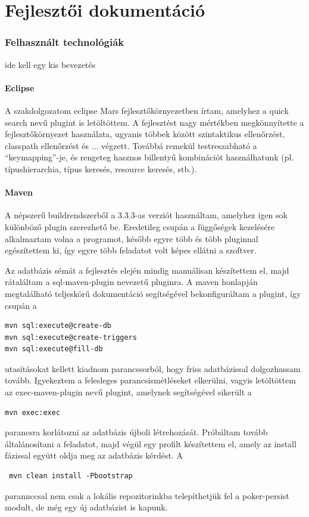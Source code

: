 \part{Fejlesztői dokumentáció}

\section{Felhasznált technológiák}
ide kell egy kis bevezetés

\subsection{Eclipse}
A szakdolgozatom eclipse Mars \cite{eclipse_mars} fejlesztőkörnyezetben írtam, amelyhez a quick search \cite{quick_search} nevű plugint is letöltöttem. A fejlesztést nagy mértékben megkönnyítette a fejlesztőkörnyezet használata, ugyanis többek között szintaktikus ellenőrzést, classpath ellenőrzést és ... végzett. Továbbá remekül testreszabható a ``keymapping''-je, és rengeteg hasznos billentyű kombinációt használhatunk (pl. típushierarchia, típus keresés, resource keresés, stb.).

\subsection{Maven}
A népszerű buildrendszerből a 3.3.3-as verziót használtam, amelyhez igen sok különböző plugin szerezhető be. Eredetileg csupán a függőségek kezelésére alkalmaztam volna a programot, később egyre több és több pluginnal egészítettem ki, így egyre több feladatot volt képes ellátni a szoftver.

Az adatbázis sémát a fejlesztés elején mindig manuálisan készítettem el, majd rátaláltam a sql-maven-plugin nevezetű pluginra. A maven honlapján megtalálható teljeskörű dokumentáció segítségével bekonfiguráltam a plugint, így csupán a
 \begin{verbatim}
mvn sql:execute@create-db
mvn sql:execute@create-triggers
mvn sql:execute@fill-db
\end{verbatim}
utasításokat kellett kiadnom parancssorból, hogy friss adatbázissal dolgozhassam tovább. Igyekeztem a felesleges parancsismétléseket elkerülni, vagyis letöltöttem az exec-maven-plugin nevű plugint, amelynek segítségével sikerült a 
 \begin{verbatim}
mvn exec:exec
\end{verbatim}
parancsra korlátozni az adatbázis újboli létrehozását. Próbáltam tovább általánosítani a feladatot, majd végül egy profilt készítettem el, amely az install fázissal együtt oldja meg az adatbázis kérdést. A 
 \begin{verbatim}
 mvn clean install -Pbootstrap
 \end{verbatim}
parannccsal nem csak a lokális repozitorinkba telepíthetjük fel a poker-persist modult, de még egy új adatbázist is kapunk.

